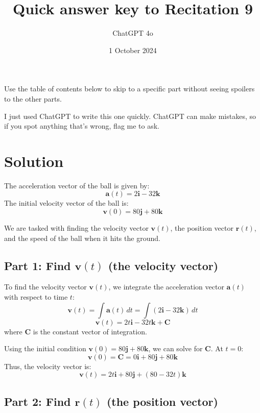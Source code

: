\documentclass[11pt]{article}
\begin{document}
\title{Quick answer key to Recitation 9}
\author{ChatGPT 4o}
\date{1 October 2024}
\maketitle

Use the table of contents below to skip to a specific part
without seeing spoilers to the other parts.

I just used ChatGPT to write this one quickly.
ChatGPT can make mistakes, so if you spot anything that's wrong, flag me to ask.

\tableofcontents



\newpage

\section{Solution}

The acceleration vector of the ball is given by:
\[
\mathbf{a}(t) = 2 \mathbf{i} - 32 \mathbf{k}
\]
The initial velocity vector of the ball is:
\[
\mathbf{v}(0) = 80 \mathbf{j} + 80 \mathbf{k}
\]

We are tasked with finding the velocity vector \( \mathbf{v}(t) \), the position vector \( \mathbf{r}(t) \), and the speed of the ball when it hits the ground.

\subsection{Part 1: Find \( \mathbf{v}(t) \) (the velocity vector)}

To find the velocity vector \( \mathbf{v}(t) \), we integrate the acceleration vector \( \mathbf{a}(t) \) with respect to time \( t \):
\[
\mathbf{v}(t) = \int \mathbf{a}(t) \, dt = \int (2 \mathbf{i} - 32 \mathbf{k}) \, dt
\]
\[
\mathbf{v}(t) = 2t \mathbf{i} - 32t \mathbf{k} + \mathbf{C}
\]
where \( \mathbf{C} \) is the constant vector of integration.

Using the initial condition \( \mathbf{v}(0) = 80 \mathbf{j} + 80 \mathbf{k} \), we can solve for \( \mathbf{C} \). At \( t = 0 \):
\[
\mathbf{v}(0) = \mathbf{C} = 0 \mathbf{i} + 80 \mathbf{j} + 80 \mathbf{k}
\]
Thus, the velocity vector is:
\[
\mathbf{v}(t) = 2t \mathbf{i} + 80 \mathbf{j} + (80 - 32t) \mathbf{k}
\]

\newpage

\subsection{Part 2: Find \( \mathbf{r}(t) \) (the position vector)}
\end{document}
